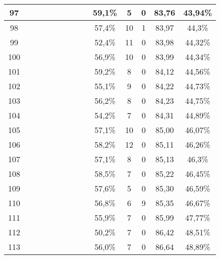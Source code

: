 \begin{longtable}{|c|c|c|c|c|c|c|c|c|c|c|c|c|c|}
97 &  \x    & \x    & \x    & \x    & \x    &       & \x\m  &       & 59,1\% &  5  & 0  & 83,76 & 43,94\% \\ \hline
98 &  \x    & \x    &       &       & \x    & \x    & \x    &       & 57,4\% &  10 & 1  & 83,97 & 44,3\% \\ \hline
99 &  \x    & \x    &       & \x    &       & \x    &       &       & 52,4\% &  11 & 0  & 83,98 & 44,32\% \\ \hline
100 &  \x    & \x    & \x    &       &       &       & \x\m  &       & 56,9\% &  10 & 0  & 83,99 & 44,34\% \\ \hline
101 &  \x    & \x    & \x    & \x    & \x    & \x\m  & \x\m  &       & 59,2\% &  8  & 0  & 84,12 & 44,56\% \\ \hline
102 &  \x    & \x    & \x    &       &       & \x    &       & \x    & 55,1\% &  9  & 0  & 84,22 & 44,73\% \\ \hline
103 &  \x    & \x    & \x    & \x    &       & \x    &       & \x\m  & 56,2\% &  8  & 0  & 84,23 & 44,75\% \\ \hline
104 &  \x    & \x    & \x    &       &       & \x    &       &       & 54,2\% &  7  & 0  & 84,31 & 44,89\% \\ \hline
105 &  \x    & \x    & \x    & \x    &       & \x\m  & \x    &       & 57,1\% &  10 & 0  & 85,00 & 46,07\% \\ \hline
106 &  \x    & \x    &       & \x    & \x    &       &       &       & 58,2\% &  12 & 0  & 85,11 & 46,26\% \\ \hline
107 &  \x    & \x    & \x    & \x    &       & \x\m  &       &       & 57,1\% &  8  & 0  & 85,13 & 46,3\% \\ \hline
108 &  \x    & \x    & \x    & \x    &       & \x    & \x\m  &       & 58,5\% &  7  & 0  & 85,22 & 46,45\% \\ \hline
109 &  \x    & \x    &       & \x    & \x    &       & \x    &       & 57,6\% &  5  & 0  & 85,30 & 46,59\% \\ \hline
110 &  \x    & \x    & \x    &       &       & \x\m  & \x\m  &       & 56,8\% &  6  & 9  & 85,35 & 46,67\% \\ \hline
111 &  \x    & \x    & \x    &       &       & \x\m  &       & \x    & 55,9\% &  7  & 0  & 85,99 & 47,77\% \\ \hline
112 &  \x    & \x    &       &       &       & \x\m  &       & \x\m  & 50,2\% &  7  & 0  & 86,42 & 48,51\% \\ \hline
113 &  \x    & \x    & \x    &       &       &       &       & \x    & 56,0\% &  7  & 0  & 86,64 & 48,89\% \\ \hline

\end{longtable}
